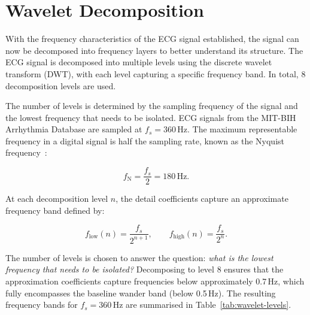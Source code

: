 \documentclass[11pt]{article}
\begin{document}
\section{Wavelet Decomposition}\label{sec:wavelet}
With the frequency characteristics of the ECG signal established, the signal can now be decomposed into frequency layers to better understand its structure. The ECG signal is decomposed into multiple levels using the discrete wavelet transform (DWT), with each level capturing a specific frequency band. In total, 8 decomposition levels are used.

The number of levels is determined by the sampling frequency of the signal and the lowest frequency that needs to be isolated. ECG signals from the MIT-BIH Arrhythmia Database are sampled at $f_s = 360$\,Hz. The maximum representable frequency in a digital signal is half the sampling rate, known as the Nyquist frequency~\cite{tereshchenko_frequency_2015, zidelmal_qrs_2012}:

$$f_\mathrm{N} = \frac{f_s}{2} = 180\,\text{Hz}.$$

At each decomposition level $n$, the detail coefficients capture an approximate frequency band defined by:

$$f_\text{low}(n) = \frac{f_s}{2^{n+1}}, \qquad f_\text{high}(n) = \frac{f_s}{2^{n}}.$$

The number of levels is chosen to answer the question: \textit{what is the lowest frequency that needs to be isolated?} Decomposing to level 8 ensures that the approximation coefficients capture frequencies below approximately 0.7\,Hz, which fully encompasses the baseline wander band (below 0.5\,Hz). The resulting frequency bands for $f_s = 360$\,Hz are summarised in Table~\ref{tab:wavelet-levels}.
\end{document}
